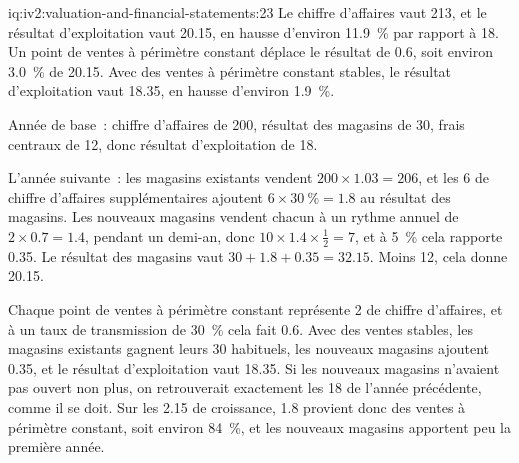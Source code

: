 \enlargethispage{-2\baselineskip}%
\begin{solution}{iq:iv2:valuation-and-financial-statements:23}
Le chiffre d'affaires vaut 213, et le résultat d'exploitation vaut 20.15, en hausse d'environ 11.9~\% par rapport à 18. Un point de ventes à périmètre constant déplace le résultat de 0.6, soit environ 3.0~\% de 20.15. Avec des ventes à périmètre constant stables, le résultat d'exploitation vaut 18.35, en hausse d'environ 1.9~\%.

Année de base~: chiffre d'affaires de 200, résultat des magasins de 30, frais centraux de 12, donc résultat d'exploitation de 18.

L'année suivante~: les magasins existants vendent $200 \times 1.03 = 206$, et les 6 de chiffre d'affaires supplémentaires ajoutent $6 \times 30~\% = 1.8$ au résultat des magasins. Les nouveaux magasins vendent chacun à un rythme annuel de $2 \times 0.7 = 1.4$, pendant un demi-an, donc $10 \times 1.4 \times \tfrac12 = 7$, et à 5~\% cela rapporte 0.35. Le résultat des magasins vaut $30 + 1.8 + 0.35 = 32.15$. Moins 12, cela donne 20.15.

Chaque point de ventes à périmètre constant représente 2 de chiffre d'affaires, et à un taux de transmission de 30~\% cela fait 0.6. Avec des ventes stables, les magasins existants gagnent leurs 30 habituels, les nouveaux magasins ajoutent 0.35, et le résultat d'exploitation vaut 18.35. Si les nouveaux magasins n'avaient pas ouvert non plus, on retrouverait exactement les 18 de l'année précédente, comme il se doit. Sur les 2.15 de croissance, 1.8 provient donc des ventes à périmètre constant, soit environ 84~\%, et les nouveaux magasins apportent peu la première année.

\end{solution}

